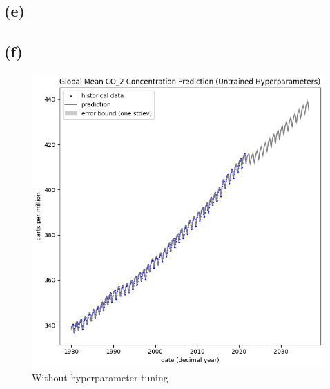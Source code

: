 \documentclass[12pt]{article}
\begin{document}
\subsection*{(e)}

\subsection*{(f)}

\begin{figure}[h]
\centering
\begin{minipage}{.5\textwidth}
  \centering
\includegraphics[scale=0.5]{outputs/q2/f-extrapolation-untrained}
\caption{Without hyperparameter tuning}
\label{fig:f-extrapolation-untrained}
\end{minipage}%
\begin{minipage}{.5\textwidth}
  \centering

\end{minipage}
\end{figure}
\end{document}
